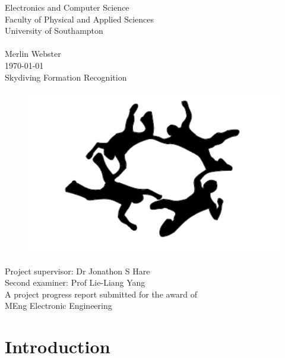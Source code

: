 \documentclass[a4paper, 12pt]{article}
\begin{document}
\begin{titlepage}
\begin{center}{\LARGE
Electronics and Computer Science\\
Faculty of Physical and Applied Sciences\\
University of Southampton\\
\hfill \break
\hfill \break
\hfill \break\\
Merlin Webster\\
\today\\
\hfill \break
Skydiving Formation Recognition\\
\begin{figure}[H]
	\centering
	\includegraphics[width=.7\linewidth]{fs_silhouette.png}
\end{figure}
Project supervisor: Dr Jonathon S Hare\\
Second examiner: Prof Lie-Liang Yang\\
\hfill \break
\hfill \break
A project progress report submitted for the award of\\
MEng Electronic Engineering\\}
\end{center}
\end{titlepage}
%
\section{Introduction}
%
\end{document}
